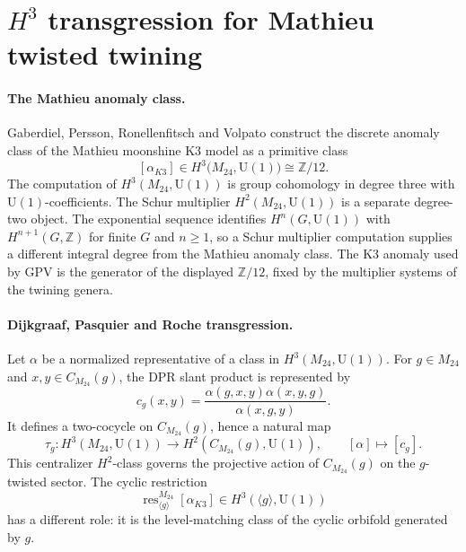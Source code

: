 
\providecommand{\CM}{C_{M_{24}}}
\providecommand{\U}{\mathrm{U}(1)}
\providecommand{\Z}{\mathbb{Z}}
\providecommand{\kBKM}{\kappa_{\mathrm{BKM}}}
\providecommand{\kcat}{\kappa_{\mathrm{cat}}}
\providecommand{\kch}{\kappa_{\mathrm{ch}}}
\providecommand{\kfib}{\kappa_{\mathrm{fiber}}}
\providecommand{\aKthree}{[\alpha_{K3}]}
\providecommand{\res}{\operatorname{res}}

\section*{$H^3$ transgression for Mathieu twisted twining}

\paragraph{The Mathieu anomaly class.}
Gaberdiel, Persson, Ronellenfitsch and Volpato construct the
discrete anomaly class of the Mathieu moonshine K3 model as a primitive
class
\[
  \aKthree\in H^3\bigl(M_{24},\U\bigr)\cong\Z/12.
\]
The computation of \(H^3(M_{24},\U)\) is group cohomology in degree
three with \(\U\)-coefficients. The Schur multiplier
\(H^2(M_{24},\U)\) is a separate degree-two object. The exponential
sequence identifies \(H^n(G,\U)\) with \(H^{n+1}(G,\Z)\) for finite
\(G\) and \(n\geq 1\), so a Schur multiplier computation supplies a
different integral degree from the Mathieu anomaly class. The K3
anomaly used by GPV is the generator of the displayed \(\Z/12\),
fixed by the multiplier systems of the twining genera.

\paragraph{Dijkgraaf, Pasquier and Roche transgression.}
Let \(\alpha\) be a normalized representative of a class in
\(H^3(M_{24},\U)\). For \(g\in M_{24}\) and
\(x,y\in \CM(g)\), the DPR slant product is represented by
\[
  c_g(x,y)=
  \frac{\alpha(g,x,y)\alpha(x,y,g)}
       {\alpha(x,g,y)}.
\]
It defines a two-cocycle on \(\CM(g)\), hence a natural map
\[
  \tau_g\colon H^3(M_{24},\U)\longrightarrow H^2(\CM(g),\U),
  \qquad [\alpha]\longmapsto [c_g].
\]
This centralizer \(H^2\)-class governs the projective action of
\(\CM(g)\) on the \(g\)-twisted sector. The cyclic restriction
\[
  \res^{M_{24}}_{\langle g\rangle}\aKthree
  \in H^3(\langle g\rangle,\U)
\]
has a different role: it is the level-matching class of the cyclic
orbifold generated by \(g\).

